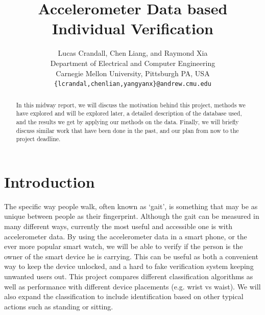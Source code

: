 \documentclass[10pt,twocolumn,letterpaper]{article}
\begin{document}
\title{Accelerometer Data based Individual Verification}

\author{Lucas Crandall, Chen Liang, and Raymond Xia\\ 
Department of Electrical and Computer Engineering\\
Carnegie Mellon University, Pittsburgh PA, USA\\
{\tt\small \{lcrandal,chenlian,yangyanx\}@andrew.cmu.edu}
}

\maketitle

\begin{abstract}
   In this midway report, we will discuss the motivation behind this project, methods we have explored and will be explored later, a detailed description of the database used, and the results we get by applying our methods on the data. Finally, we will briefly discuss similar work that have been done in the past, and our plan from now to the project deadline.
\end{abstract}

\section{Introduction}
The specific way people walk, often known as ‘gait’, is something that may be as unique between people as their fingerprint. Although the gait can be measured in many different ways, currently the most useful and accessible one is with accelerometer data. By using the accelerometer data in a smart phone, or the ever more popular smart watch, we will be able to verify if the person is the owner of the smart device he is carrying.  This can be useful as both a convenient way to keep the device unlocked, and a hard to fake verification system keeping unwanted users out. This project compares different classification algorithms as well as performance with different device placements (e.g. wrist vs waist).  We will also expand the classification to include identification based on other typical actions such as standing or sitting.
\end{document}
